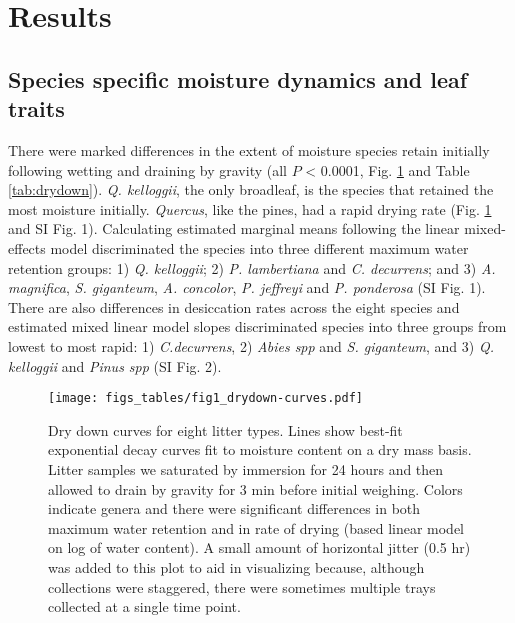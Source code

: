 \documentclass[letterpaper,12pt]{article}
\begin{document}
\section*{Results}

\subsection*{Species specific moisture dynamics and leaf traits}

There were marked differences in the extent of moisture species retain
initially following wetting and draining by gravity (all $P$ < 0.0001, Fig.
\ref{fig:drydown} and Table \ref{tab:drydown}). \emph{Q. kelloggii}, the only
broadleaf, is the species that retained the most moisture initially.
\emph{Quercus}, like the pines, had a rapid drying rate (Fig. \ref{fig:drydown}
and SI Fig. 1). Calculating estimated marginal means following the linear
mixed-effects model discriminated the species into three different maximum
water retention groups: 1) \emph{Q. kelloggii}; 2) \emph{P. lambertiana} and
\emph{C. decurrens}; and 3) \emph{A. magnifica}, \emph{S. giganteum}, \emph{A.
  concolor}, \emph{P. jeffreyi} and \emph{P. ponderosa} (SI Fig. 1). There are
also differences in desiccation rates across the eight species and estimated
mixed linear model slopes discriminated species into three groups from lowest
to most rapid: 1) \emph{C.decurrens}, 2) \emph{Abies spp} and \emph{S.
  giganteum}, and 3) \emph{Q. kelloggii} and \emph{Pinus spp} (SI Fig. 2).

\begin{figure}[h]
  \centering
\texttt{[image: figs\_tables/fig1\_drydown-curves.pdf]}
\caption{Dry down curves for eight litter types. Lines show best-fit
  exponential decay curves fit to moisture content on a dry mass basis. Litter
  samples we saturated by immersion for 24 hours and then allowed to drain by
  gravity for 3 min before initial weighing. Colors indicate genera and there
  were significant differences in both maximum water retention and in rate of
  drying (based linear model on log of water content). A small amount of
  horizontal jitter (0.5 hr) was added to this plot to aid in visualizing
  because, although collections were staggered, there were sometimes multiple
  trays collected at a single time point.}
 \label{fig:drydown}
\end{figure}
\end{document}
